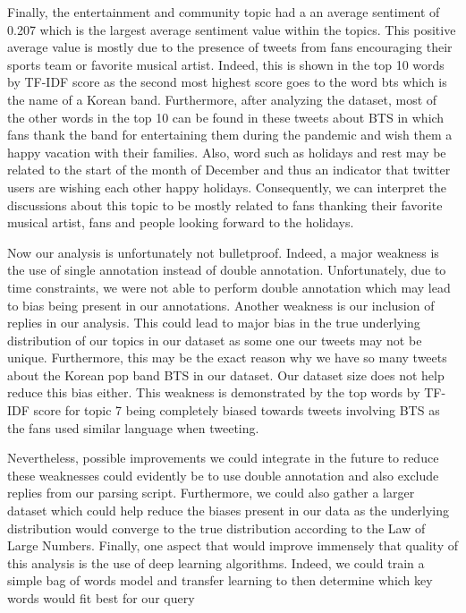 \documentclass[letterpaper]{article} %
\begin{document}
Finally, the entertainment and community topic had a an average sentiment of 0.207 which is the largest average sentiment value within the topics. This positive average value is mostly due to the presence of tweets from fans encouraging their sports team or favorite musical artist. Indeed, this is shown in the top 10 words by TF-IDF score as the second most highest score goes to the word bts which is the name of a Korean band. Furthermore, after analyzing the dataset, most of the other words in the top 10 can be found in these tweets about BTS in which fans thank the band for entertaining them during the pandemic and wish them a happy vacation with their families. Also, word such as holidays and rest may be related to the start of the month of December and thus an indicator that twitter users are wishing each other happy holidays. Consequently, we can interpret the discussions about this topic to be mostly related to fans thanking their favorite musical artist, fans and people looking forward to the holidays.

Now our analysis is unfortunately not bulletproof. Indeed, a major weakness is the use of single annotation instead of double annotation. Unfortunately, due to time constraints, we were not able to perform double annotation which may lead to bias being present in our annotations. Another weakness is our inclusion of replies in our analysis. This could lead to major bias in the true underlying distribution of our topics in our dataset as some one our tweets may not be unique. Furthermore, this may be the exact reason why we have so many tweets about the Korean pop band BTS in our dataset. Our dataset size does not help reduce this bias either. This weakness is demonstrated by the top words by TF-IDF score for topic 7 being completely biased towards tweets involving BTS as the fans used similar language when tweeting.

Nevertheless, possible improvements we could integrate in the future to reduce these weaknesses could evidently be to use double annotation and also exclude replies from our parsing script. Furthermore, we could also gather a larger dataset which could help reduce the biases present in our data as the underlying distribution would converge to the true distribution according to the Law of Large Numbers. Finally, one aspect that would improve immensely that quality of this analysis is the use of deep learning algorithms. Indeed, we could train a simple bag of words model and transfer learning to then determine which key words would fit best for our query
\end{document}
